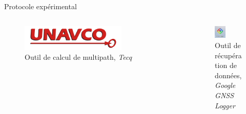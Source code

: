 \documentclass[xcolor=dvipsnames,envcountsect]{beamer}
\begin{document}
\begin{frame}{Protocole expérimental}
\begin{columns}
		\begin{column}{0.3\textwidth}
			\begin{figure}
				\centering
				\includegraphics[width=0.7\textwidth]{./Figures/UNAVCO.png}
				\caption {Outil de calcul de multipath, \textit{Tecq}}
			\end{figure}
		\end{column}

		\begin{column}{0.3\textwidth}
			\begin{figure}
				\centering
				\includegraphics[width=0.4\textwidth]{./Figures/gnss_logger.jpg}
				\caption {Outil de récupération de données, \textit{Google GNSS Logger}}
			\end{figure}
		\end{column}
	\end{columns}
\end{frame}
\end{document}
